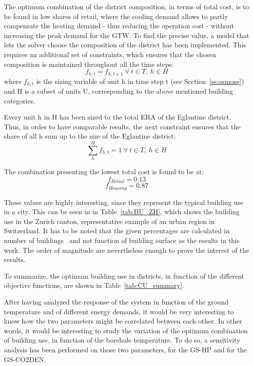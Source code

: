 \documentclass{article}
\begin{document}
The optimum combination of the district composition, in terms of total cost, is to be found in low shares of retail, where the cooling demand allows to partly compensate the heating demand - thus reducing the operation cost - without increasing the peak demand for the GTW. To find the precise value, a model that lets the solver choose the composition of the district has been implemented. This requires an additional set of constraints, which ensures that the chosen composition is maintained throughout all the time steps:
\begin{equation}
f_{h,t} = f_{h,t+1} \ \forall \ t \in T, \ h \in H
\end{equation}
where $f_{h,t}$ is the sizing variable of unit h in time step t (see Section~\ref{ss:osmose}) and H is a subset of units U, corresponding to the above mentioned building categories.

Every unit h in H has been sized to the total ERA of the Eglantine district. Thus, in order to have comparable results, the next constraint ensures that the share of all h sum up to the size of the Eglantine district:
\begin{equation}
\sum_{h}^{H} f_{h,t} = 1 \ \forall \ t \in T, \ h \in H
\end{equation}

The combination presenting the lowest total cost is found to be at:
$$f_{Retail} = 0.13 $$
$$f_{Housing} = 0.87 $$

These values are highly interesting, since they represent the typical building use in a city. This can be seen in in Table~\ref{tab:BU_ZH}, which shows the building use in the Zurich canton, representative example of an urban region in Switzerland. It has to be noted that the given percentages are calculated in number of buildings~\cite{endk-konferenzkantonalerenergiedirektorenEnergieverbrauchGebaudenFact2014} and not function of building surface as the results in this work. The order of magnitude are nevertheless enough to prove the interest of the results.



To summarize, the optimum building use in districts, in function of the different objective functions, are shown in Table~\ref{tab:CU_summary}.



After having analyzed the response of the system in function of the ground temperature and of different energy demands, it would be very interesting to know how the two parameters might be correlated between each other. In other words, it would be interesting to study the variation of the optimum combination of building use, in function of the borehole temperature. 
To do so, a sensitivity analysis has been performed on those two parameters, for the GS-HP and for the GS-CO2DEN. 
\end{document}
